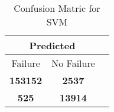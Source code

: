 \begin{table}[] 
\caption{Confusion Matric for SVM} 
\label{Table: Prediction Accuracy-NoneSVMDecisionTrees100EKF-ignoreReflection-Reflection} 
\centering 
\begin{tabular} 
 {@{}ccc@{}} 
\toprule 
\multicolumn{2}{c}{\textbf{Predicted}}
 \\ \midrule 
\multicolumn{1}{|c|}{Failure} & 
\multicolumn{1}{c|}{No Failure}
 \\ \midrule 
\multicolumn{1}{|c|}{\color{green}\textbf{153152}} & 
\multicolumn{1}{c|}{\color{red}\textbf{2537}}
 \\ \midrule 
\multicolumn{1}{|c|}{\color{red}\textbf{525}} & 
\multicolumn{1}{c|}{\color{green}\textbf{13914}}
 \\ \bottomrule 
\end{tabular} 
\end{table} 
